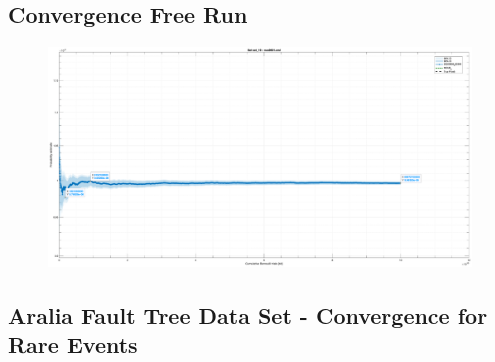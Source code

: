 \subsection{Convergence Free Run}
\begin{frame}
    \begin{figure}[h]
    \centering
    \includegraphics[width=1\textwidth]{4_casestudy/conv_nus9601.eps}
    \label{fig:rare}
\end{figure}
\end{frame}


\subsection{Aralia Fault Tree Data Set - Convergence for Rare Events}
\begin{frame}
    
\end{frame}






